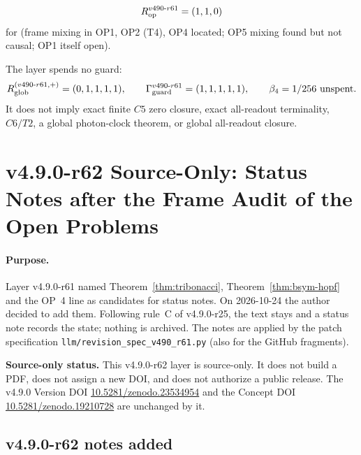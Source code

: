 \[
R_{\rm op}^{v490\text{-}r61}=(1,1,0)
\]
for (frame mixing in OP1, OP2 (T4), OP4 located; OP5 mixing found but not causal; OP1 itself open).

The layer spends no guard:
\[
R_{\rm glob}^{(v490\text{-}r61,+)}=(0,1,1,1,1),
\qquad
\Gamma_{\rm guard}^{v490\text{-}r61}=(1,1,1,1,1),
\qquad
\beta_4=1/256\ \text{unspent}.
\]
It does not imply exact finite \(C5\) zero closure, exact all-readout terminality,
\(C6/T2\), a global photon-clock theorem, or global all-readout closure.

\clearpage
\section*{v4.9.0-r62 Source-Only: Status Notes after the Frame Audit of the Open Problems}
\label{sec:v490-r62-op-status-notes}

\paragraph{Purpose.}
Layer v4.9.0-r61 named Theorem~\ref{thm:tribonacci}, Theorem~\ref{thm:bsym-hopf} and the OP~4 line as candidates for status notes.  On 2026-10-24 the author decided to add
them.  Following rule~C of v4.9.0-r25, the text stays and a status note records the state; nothing is archived.  The notes are applied by the patch specification
\texttt{llm/revision\_spec\_v490\_r61.py} (also for the GitHub fragments).

\noindent\textbf{Source-only status.}
This v4.9.0-r62 layer is source-only.  It does not build a PDF, does not assign a new DOI,
and does not authorize a public release.  The v4.9.0 Version DOI
\href{https://doi.org/10.5281/zenodo.23534954}{10.5281/zenodo.23534954} and the Concept DOI
\href{https://doi.org/10.5281/zenodo.19210728}{10.5281/zenodo.19210728} are unchanged by it.

\subsection*{v4.9.0-r62 notes added}
\label{subsec:v490-r62-notes}

